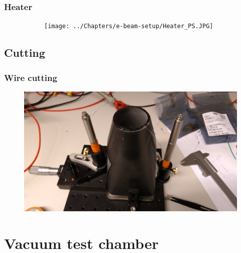 \documentclass[aspectratio=169]{beamer}
\begin{document}

\begin{frame}
	\frametitle{Heater}
	\begin{figure}[ht]
		\centering
		
%				
		
		\vspace{1cm}
		
		\begin{subfigure}[b]{0.9\textwidth}
			\texttt{[image: ../Chapters/e-beam-setup/Heater\_PS.JPG]}
		\end{subfigure}
	\end{figure}
\end{frame}

\subsection{Cutting}

\begin{frame}
	\frametitle{Wire cutting}
	\begin{figure}[ht]
		\includegraphics[width=.8\textwidth]{../Chapters/CRT-handling/Cutting_Stage.jpg}
	\end{figure}
\end{frame}

\section{Vacuum test chamber}
\end{document}

